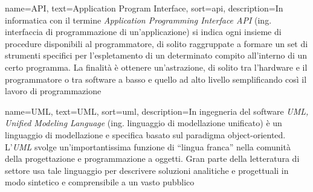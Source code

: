 













{
    name=API,
    text=Application Program Interface,
    sort=api,
    description={In informatica con il termine \emph{Application Programming Interface API} (ing. interfaccia di programmazione di un'applicazione) si indica ogni insieme di procedure disponibili al programmatore, di solito raggruppate a formare un set di strumenti specifici per l'espletamento di un determinato compito all'interno di un certo programma. La finalità è ottenere un'astrazione, di solito tra l'hardware e il programmatore o tra software a basso e quello ad alto livello semplificando così il lavoro di programmazione}
}

{
    name=UML,
    text=UML,
    sort=uml,
    description={In ingegneria del software \emph{UML, Unified Modeling Language} (ing. linguaggio di modellazione unificato) è un linguaggio di modellazione e specifica basato sul paradigma object-oriented. L'\emph{UML} svolge un'importantissima funzione di ``lingua franca'' nella comunità della progettazione e programmazione a oggetti. Gran parte della letteratura di settore usa tale linguaggio per descrivere soluzioni analitiche e progettuali in modo sintetico e comprensibile a un vasto pubblico}
}


